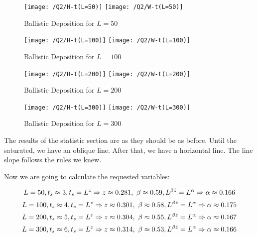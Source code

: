 \documentclass{article}
\begin{document}
    \begin{figure}[!htb]
        \centering
        \texttt{[image: /Q2/H-t(L=50)]}
        \label{fig:2.2}
        \texttt{[image: /Q2/W-t(L=50)]}
        \label{fig:2.3}
        \caption{Ballistic Deposition for $L=50$}
    \end{figure}
    \begin{figure}[!htb]
        \centering
        \texttt{[image: /Q2/H-t(L=100)]}
        \label{fig:2.4}
        \texttt{[image: /Q2/W-t(L=100)]}
        \label{fig:2.5}
        \caption{Ballistic Deposition for $L=100$}
    \end{figure}
    \begin{figure}[!htb]
        \centering
        \texttt{[image: /Q2/H-t(L=200)]}
        \label{fig:2.6}
        \texttt{[image: /Q2/W-t(L=200)]}
        \label{fig:2.7}
        \caption{Ballistic Deposition for $L=200$}
    \end{figure}
    \begin{figure}[!htb]
        \centering
        \texttt{[image: /Q2/H-t(L=300)]}
        \label{fig:2.8}
        \texttt{[image: /Q2/W-t(L=300)]}
        \label{fig:2.9}
        \caption{Ballistic Deposition for $L=300$}
    \end{figure}

    The results of the statistic section are as they should be as before.
    Until the saturated, we have an oblique line.
    After that, we have a horizontal line.
    The line slope follows the rules we knew.

    Now we are going to calculate the requested variables:

    \begin{equation}
        \centering
        L = 50, t_{s} \approx 3, t_{s} = L^z \Rightarrow z \approx 0.281,\
        \beta \approx 0.59, L^{\beta \dot z} = L^{\alpha} \Rightarrow \alpha \approx 0.166
    \end{equation}
    \begin{equation}
        \centering
        L = 100, t_{s} \approx 4, t_{s} = L^z \Rightarrow z \approx 0.301,\
        \beta \approx 0.58, L^{\beta \dot z} = L^{\alpha} \Rightarrow \alpha \approx 0.175
    \end{equation}
    \begin{equation}
        \centering
        L = 200, t_{s} \approx 5, t_{s} = L^z \Rightarrow z \approx 0.304,\
        \beta \approx 0.55, L^{\beta \dot z} = L^{\alpha} \Rightarrow \alpha \approx 0.167
    \end{equation}
    \begin{equation}
        \centering
        L = 300, t_{s} \approx 6, t_{s} = L^z \Rightarrow z \approx 0.314,\
        \beta \approx 0.53, L^{\beta \dot z} = L^{\alpha} \Rightarrow \alpha \approx 0.166
    \end{equation}
\end{document}
